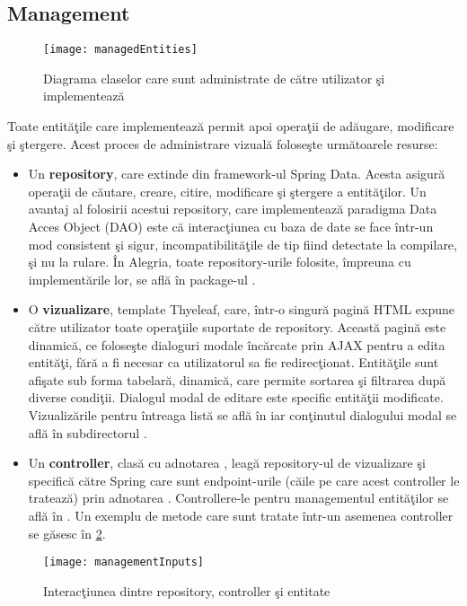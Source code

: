 \subsection{Management}
\begin{figure}[H]
	\centering
	\texttt{[image: managedEntities]}
	\captionsetup{justification=centering}
	\caption{Diagrama claselor care sunt administrate de către utilizator şi implementează }
	\label{fig:managedEntities}
\end{figure}
Toate entităţile care implementează  permit apoi operaţii de adăugare, modificare şi ştergere. Acest proces de administrare vizuală foloseşte următoarele resurse:
\begin{itemize}
	\item Un \textbf{repository}, care extinde  din framework-ul Spring Data. Acesta asigură operaţii de căutare, creare, citire, modificare şi ştergere a entităţilor. Un avantaj al folosirii  acestui repository, care implementează paradigma Data Acces Object (DAO) este că interacţiunea cu baza de date se face într-un mod consistent şi sigur, incompatibilităţile de tip fiind detectate la compilare, şi nu la rulare. În Alegria, toate repository-urile folosite, împreuna cu implementările lor, se află în package-ul .
	\item O \textbf{vizualizare}, template Thyeleaf, care, într-o singură pagină HTML expune către utilizator toate operaţiile suportate de repository. Această pagină este dinamică, ce foloseşte dialoguri modale încărcate prin AJAX pentru a edita entităţi, fără a fi necesar ca utilizatorul sa fie redirecţionat. Entităţile sunt afişate sub forma tabelară, dinamică, care permite sortarea şi filtrarea după diverse condiţii. Dialogul modal de editare este specific entităţii modificate. Vizualizările pentru întreaga listă se află în  iar conţinutul dialogului modal se află în subdirectorul .
	\item Un \textbf{controller}, clasă cu adnotarea , leagă repository-ul de vizualizare şi specifică către Spring care sunt endpoint-urile (căile pe care acest controller le tratează) prin adnotarea . Controllere-le pentru managementul entităţilor se află în . Un exemplu de metode care sunt tratate într-un asemenea controller se găsesc în \cref{fig:managementInputs}.
\end{itemize}
\begin{figure}[H]
	\centering
	\captionsetup{justification=centering}
	\texttt{[image: managementInputs]}
	\caption{Interacţiunea dintre repository, controller şi entitate}
	\label{fig:managementInputs}
\end{figure}

